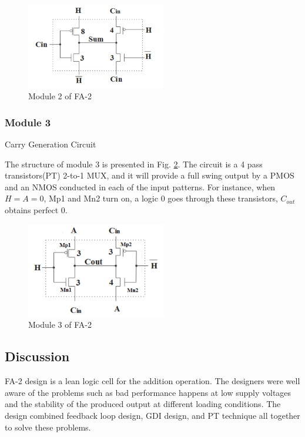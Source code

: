 \documentclass[conference]{IEEEtran}
\begin{document}
\begin{figure}[!ht]
	\centering
	\includegraphics[width=2.4in]{fa2-m2.png}
	\caption{Module 2 of FA-2}
	\label{fig:fa2-m2}
\end{figure}

\subsubsection{Module 3} Carry Generation Circuit

The structure of module 3 is presented in Fig. \ref{fig:fa2-m3}.
The circuit is a 4 pass transistors(PT) 2-to-1 MUX, and it will provide a full swing output by a PMOS and an NMOS conducted in each of the input patterns.
For instance, when \(H = A = 0\), Mp1 and Mn2 turn on, a logic 0 goes through these transistors, \(C_{out}\) obtains perfect 0.

\begin{figure}[!ht]
	\centering
	\includegraphics[width=2.4in]{fa2-m3.png}
	\caption{Module 3 of FA-2}
	\label{fig:fa2-m3}
\end{figure}

\newpage

\subsection{Discussion}

FA-2 design is a lean logic cell for the addition operation.
The designers were well aware of the problems such as bad performance happens at low supply voltages
and the stability of the produced output at different loading conditions.
The design combined feedback loop design, GDI design, and PT technique all together to solve these problems.
\end{document}
